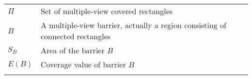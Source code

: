 \begin{table}
\begin{tabularx}{.8\textwidth}{!{\vline width 1.2pt}Y!{\vline width 1.2pt}Z!{\vline width 1.2pt}}
	$\Pi$ & Set of multiple-view covered rectangles \\
	$B$ & A multiple-view barrier, actually a region consisting of connected rectangles \\
	$S_B$ & Area of the barrier $B$ \\
	$E(B)$ & Coverage value of barrier $B$ \\
\end{tabularx}
\end{table}